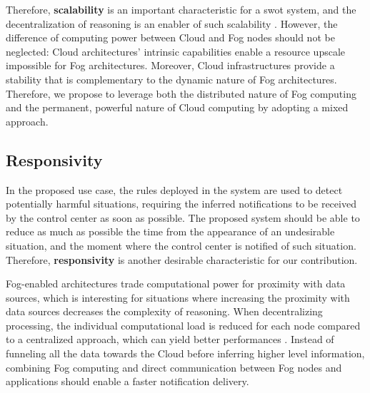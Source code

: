 \documentclass{iosart2c}
\newcommand{\Nicolas}[1]{\textcolor{red}{ Nicolas: \textbf{#1} }}
\begin{document}
Therefore, \textbf{scalability} is an important characteristic for a \gls{swot} system, and the decentralization of reasoning is an enabler of such scalability \cite{Maarala2017}.
However, the difference of computing power between Cloud and Fog nodes should not be neglected: Cloud architectures' intrinsic capabilities enable a resource upscale impossible for Fog architectures.
Moreover, Cloud infrastructures provide a stability that is complementary to the dynamic nature of Fog architectures.
Therefore, we propose to leverage both the distributed nature of Fog computing and the permanent, powerful nature of Cloud computing by adopting a mixed approach. 

\subsection{Responsivity}

In the proposed use case, the rules deployed in the system are used to detect potentially harmful situations, requiring the inferred notifications to be received by the control center as soon as possible. 
The proposed system should be able to reduce as much as possible the time from the appearance of an undesirable situation, and the moment where the control center is notified of such situation. 
Therefore, \textbf{responsivity} is another desirable characteristic for our contribution.

Fog-enabled architectures trade computational power for proximity with data sources, which is interesting for situations where increasing the proximity with data sources decreases the complexity of reasoning.
When decentralizing processing, the individual computational load is reduced for each node compared to a centralized approach, which can yield better performances \cite{Su2018}.
Instead of funneling all the data towards the Cloud before inferring higher level information, combining Fog computing and direct communication between Fog nodes and applications should enable a faster notification delivery.

%
%
%
\end{document}
